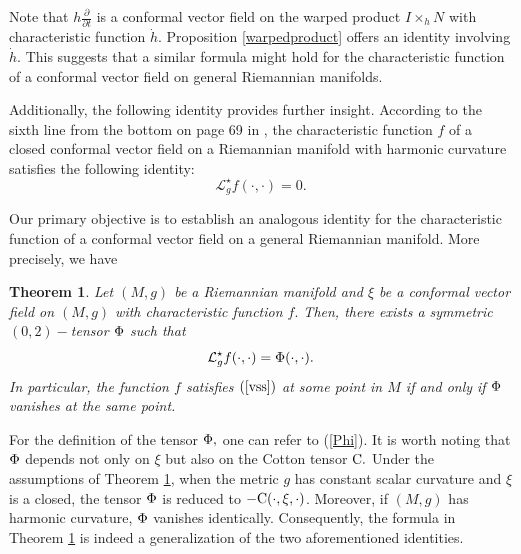 \documentclass[10pt,leqno,oneside]{amsart}
\newtheorem{Thm}{Theorem}
\begin{document}
         Note that $h\frac{\partial}{\partial t}$ is a conformal vector field on the warped product $I\times_hN$ with characteristic function \(\dot{h}\). Proposition \ref{warpedproduct} offers an identity involving $\dot{h}.$ This suggests that a similar formula might hold for the characteristic function of a conformal vector field on general Riemannian manifolds.

         Additionally, the following identity provides further insight. According to the sixth line from the bottom on page 69 in {\rm\cite{Lafontaine1983}}, the characteristic function \(f\) of a closed conformal vector field on a Riemannian manifold with harmonic curvature satisfies the following identity:
        \[\mathcal{L}_g^{\star}f(\cdot,\cdot)=0.\]

         Our primary objective is to establish an analogous identity for the characteristic function of a conformal vector field on a general Riemannian manifold. More precisely, we have
    \begin{Thm}\label{firstthm}
          Let $(M, g)$ be a Riemannian manifold and $\xi$ be a conformal vector field on $(M, g)$ with characteristic function $f.$ Then, there exists a symmetric $(0,2)-$tensor $\rm{\Phi}$ such that
          $$\mathcal{L}_g^{\star}f(\cdot,\cdot)=\rm{\Phi}(\cdot,\cdot).$$
          In particular, the function $f$ satisfies $(\ref{vss})$ at some point in $M$ if and only if $\rm{\Phi}$ vanishes at the same point.
     \end{Thm}

          For the definition of the tensor $\rm{\Phi},$ one can refer to (\ref{Phi}). It is worth noting that $\rm{\Phi}$ depends not only on $\xi$ but also on the Cotton tensor $\rm{C}.$ Under the assumptions of Theorem \ref{firstthm}, when the metric $g$ has constant scalar curvature and $\xi$ is a closed, the tensor $\rm{\Phi}$ is reduced to $-\rm{C}(\cdot,\xi,\cdot)$. Moreover, if \((M,g)\) has harmonic curvature, \(\rm{\Phi}\) vanishes identically. Consequently, the formula in Theorem \ref{firstthm} is indeed a generalization of the two aforementioned identities.
\end{document}
